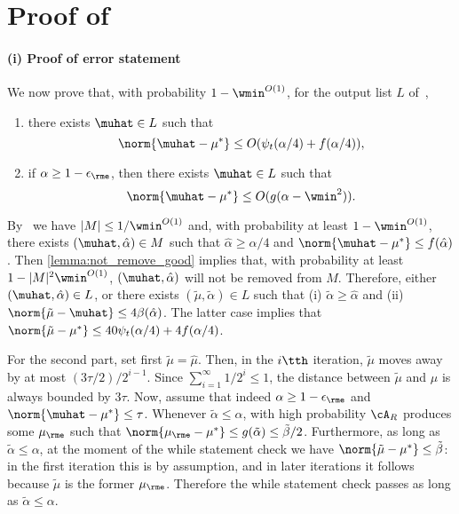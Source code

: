 \section{Proof of~}
\label{sec:inner_stage_appendix}

\paragraph{(i) Proof of error statement} We now prove that, with probability \(1 - \wmin^{O(1)}\), for the output list \(L\) of~, 
\begin{enumerate}
    \item there exists \(\muhat \in L\) such that 
        \[\norm{\muhat-\mu^{\ast}} \leq O(\psi_t(\alpha/4) + f(\alpha/4)),\]
        \item if \(\alpha \geq 1-\epsilon_{\rme}\), then there exists \(\muhat \in L\) such that
        \[\norm{\muhat-\mu^{\ast}} \leq O(g(\alpha - \wmin^2)).\]
\end{enumerate}
By~ we have $|M| \leq 1/\wmin^{O(1)}$ and, with probability at least $1-\wmin^{O(1)}$, there exists \((\muhat, \hat \alpha) \in M\) such that \(\hat \alpha \geq \alpha/4\) and \(\norm{\muhat - \mu^{\ast}} \leq f(\hat\alpha)\).
Then \cref{lemma:not_remove_good} implies that, with probability at least $1-|M|^2\wmin^{O(1)}$, \((\muhat, \hat \alpha)\) will not be removed from \(M\).
Therefore, either \((\muhat, \hat \alpha) \in L\), or there exists \((\tilde \mu, \tilde \alpha) \in L\)
such that (i) \(\tilde \alpha \geq \hat \alpha\) and (ii) \(\norm{\tilde \mu-\muhat} \leq 4 \beta(\hat \alpha)\).
The latter case implies that \(\norm{\tilde \mu - \mu^{\ast}} \leq 40 \psi_t(\alpha/4) + 4f(\alpha/4)\).

For the second part, set first $\tilde\mu = \hat\mu$.
Then, in the $i\tth$ iteration, $\tilde\mu$ moves away by at most $(3\tau/2)/2^{i-1}$.
Since $\sum_{i=1}^\infty 1/2^{i} \leq 1$, the distance between $\tilde\mu$ and $\hat\mu$ is always bounded by $3\tau$. Now, assume that indeed $\alpha \geq 1-\epsilon_{\rme}$ and $\norm{\muhat - \mu^*} \leq \tau$. Whenever $\tilde{\alpha} \leq \alpha$, with high probability $\cA_R$ produces some $\mu_{\rme}$ such that $\norm{\mu_{\rme} - \mu^*} \leq g(\tilde\alpha) \leq \tilde{\beta}/2$.
Furthermore, as long as $\tilde\alpha \leq \alpha$, at the moment of the while statement check we have $\norm{\tilde\mu - \mu^*} \leq \tilde{\beta}$: in the first iteration this is by assumption, and in later iterations it follows because $\tilde\mu$ is the former $\mu_{\rme}$.
Therefore the while statement check passes as long as $\tilde\alpha \leq \alpha$.

